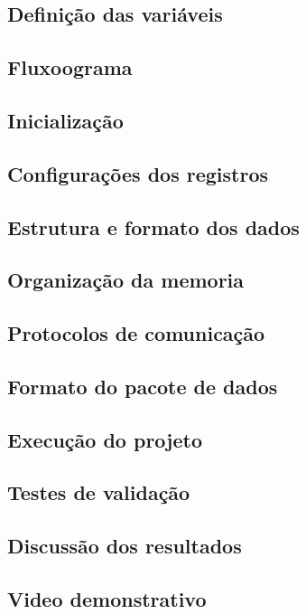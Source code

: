 \subsection{Definição das variáveis}

\subsection{Fluxoograma}

\subsection{Inicialização}

\subsection{Configurações dos registros}

\subsection{Estrutura e formato dos dados}

\subsection{Organização da memoria}

\subsection{Protocolos de comunicação}

\subsection{Formato do pacote de dados}


\subsection{Execução do projeto}

\subsection{Testes de validação}


\subsection{Discussão dos resultados}


\subsection{Video demonstrativo}


